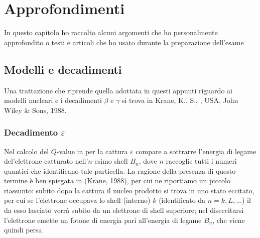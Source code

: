 
\chapter{Approfondimenti}\label{complementi}

In questo capitolo ho raccolto alcuni argomenti che ho personalmente approfondito o testi e articoli che ho usato durante la preparazione dell'esame 

\section{Modelli e decadimenti}\label{compl-krane}
Una trattazione che riprende quella adottata in questi appunti riguardo ai modelli nucleari e i decadimenti $\beta$ e $\gamma$ si trova in Krane, K., S., \textit{}, USA, John Wiley \& Sons, 1988.
\subsection{Decadimento $\varepsilon$}\label{compl-epsilon}
Nel calcolo del $Q$-value in  per la cattura $\varepsilon$ compare a sottrarre l'energia di legame del'elettrone catturato nell'$n$-esimo shell $B_n$, dove $n$ raccoglie tutti i numeri quantici che identificano tale particella. La ragione della presenza di questo termine è ben spiegata in (Krane, 1988), per cui ne riportiamo un piccolo riassunto: subito dopo la cattura il nucleo prodotto si trova in uno stato eccitato, per cui se l'elettrone occupava lo shell (interno) $k$ (identificato da $n=k,L,\dots$) il  da esso lasciato verrà subito  da un elettrone di shell superiore; nel diseccitarsi l'elettrone emette un fotone di energia pari all'energia di legame $B_n$, che viene quindi persa.

